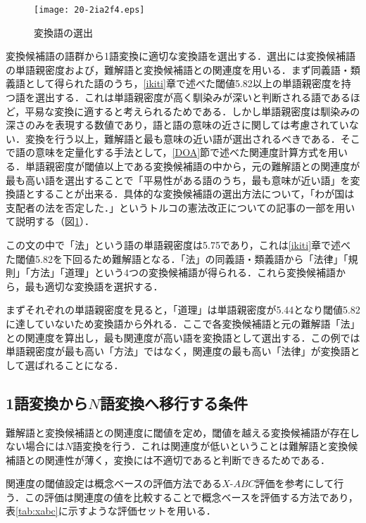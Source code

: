 \documentclass[japanese]{jnlp_1.4}
\begin{document}
\begin{figure}[b]
 \begin{center}
  \texttt{[image: 20-2ia2f4.eps]}
 \end{center}
 \caption{変換語の選出}
 \label{fig:syorirei}
\end{figure}

変換候補語の語群から1語変換に適切な変換語を選出する．選出には変換候補語の単語親密度および，難解語と変換候補語との関連度を用いる．まず同義語・類義語として得られた語のうち，\ref{ikiti}章で述べた閾値5.82以上の単語親密度を持つ語を選出する．これは単語親密度が高く馴染みが深いと判断される語であるほど，平易な変換に適すると考えられるためである．しかし単語親密度は馴染みの深さのみを表現する数値であり，語と語の意味の近さに関しては考慮されていない．変換を行う以上，難解語と最も意味の近い語が選出されるべきである．そこで語の意味を定量化する手法として，\ref{DOA}節で述べた関連度計算方式を用いる．単語親密度が閾値以上である変換候補語の中から，元の難解語との関連度が最も高い語を選出することで「平易性がある語のうち，最も意味が近い語」を変換語とすることが出来る．具体的な変換候補語の選出方法について，「わが国は支配者の法を否定した．」というトルコの憲法改正についての記事の一部を用いて説明する（図\ref{fig:syorirei}）．

この文の中で「法」という語の単語親密度は5.75であり，これは\ref{ikiti}章で述べた閾値5.82を下回るため難解語となる．「法」の同義語・類義語から「法律」「規則」「方法」「道理」という4つの変換候補語が得られる．これら変換候補語から，最も適切な変換語を選択する．

まずそれぞれの単語親密度を見ると，「道理」は単語親密度が5.44となり閾値5.82に達していないため変換語から外れる．ここで各変換候補語と元の難解語「法」との関連度を算出し，最も関連度が高い語を変換語として選出する．この例では単語親密度が最も高い「方法」ではなく，関連度の最も高い「法律」が変換語として選ばれることになる．



\subsection{1語変換から$N$語変換へ移行する条件}
\label{1Nzyouken}

難解語と変換候補語との関連度に閾値を定め，閾値を越える変換候補語が存在しない場合には$N$語変換を行う．これは関連度が低いということは難解語と変換候補語との関連性が薄く，変換には不適切であると判断できるためである．

関連度の閾値設定は概念ベースの評価方法である$X$-$ABC$評価\cite{Article_04}を参考にして行う．この評価は関連度の値を比較することで概念ベースを評価する方法であり，表\ref{tab:xabc}に示すような評価セットを用いる．
\end{document}
